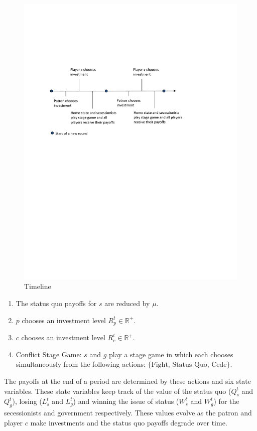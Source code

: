 \documentclass[11pt,letterpaper, notitlepage]{article}
\begin{document}
\begin{figure}
\includegraphics{Timeline2.pdf}
\caption{Timeline}
\end{figure}

\begin{enumerate} 
\item The status quo payoffs for $s$ are reduced by $\mu$.

\item $p$ chooses an investment level $R_p^t\in \mathbb{R}^+$. 
 
\item $c$ chooses an investment level $R_c^t\in \mathbb{R}^+$. 
 
\item Conflict Stage Game: $s$ and $g$ play a stage game in which each chooses simultaneously from the following actions: $\{\text{Fight, Status Quo, Cede}\}$. 
\end{enumerate}

The payoffs at the end of a period are determined by these actions and six state variables. These state variables keep track of the value of the status quo ($Q_s^t$ and $Q_g^t$), losing ($L_s^t$ and $L_g^t$) and winning the issue of status ($W_s^t$ and $W_g^t$) for the secessionists and government respectively. These values evolve as the patron and player $c$ make investments and the status quo payoffs degrade over time.
\end{document}
